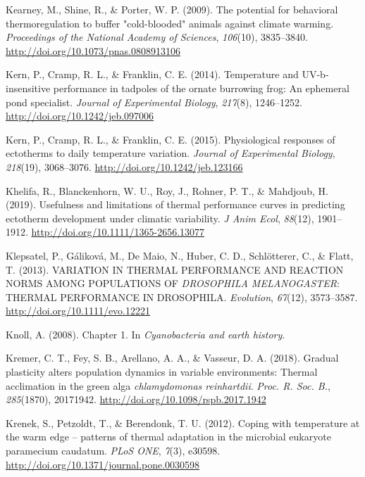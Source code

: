 \documentclass[12pt,twoside]{reedthesis}
\begin{document}
\leavevmode\hypertarget{ref-kearney_potential_2009}{}%
Kearney, M., Shine, R., \& Porter, W. P. (2009). The potential for behavioral thermoregulation to buffer "cold-blooded" animals against climate warming. \emph{Proceedings of the National Academy of Sciences}, \emph{106}(10), 3835--3840. \url{http://doi.org/10.1073/pnas.0808913106}

\leavevmode\hypertarget{ref-kern_temperature_2014}{}%
Kern, P., Cramp, R. L., \& Franklin, C. E. (2014). Temperature and UV-b-insensitive performance in tadpoles of the ornate burrowing frog: An ephemeral pond specialist. \emph{Journal of Experimental Biology}, \emph{217}(8), 1246--1252. \url{http://doi.org/10.1242/jeb.097006}

\leavevmode\hypertarget{ref-kern_physiological_2015-3}{}%
Kern, P., Cramp, R. L., \& Franklin, C. E. (2015). Physiological responses of ectotherms to daily temperature variation. \emph{Journal of Experimental Biology}, \emph{218}(19), 3068--3076. \url{http://doi.org/10.1242/jeb.123166}

\leavevmode\hypertarget{ref-khelifa_usefulness_2019}{}%
Khelifa, R., Blanckenhorn, W. U., Roy, J., Rohner, P. T., \& Mahdjoub, H. (2019). Usefulness and limitations of thermal performance curves in predicting ectotherm development under climatic variability. \emph{J Anim Ecol}, \emph{88}(12), 1901--1912. \url{http://doi.org/10.1111/1365-2656.13077}

\leavevmode\hypertarget{ref-klepsatel_variation_2013}{}%
Klepsatel, P., Gáliková, M., De Maio, N., Huber, C. D., Schlötterer, C., \& Flatt, T. (2013). VARIATION IN THERMAL PERFORMANCE AND REACTION NORMS AMONG POPULATIONS OF \emph{DROSOPHILA MELANOGASTER}: THERMAL PERFORMANCE IN DROSOPHILA. \emph{Evolution}, \emph{67}(12), 3573--3587. \url{http://doi.org/10.1111/evo.12221}

\leavevmode\hypertarget{ref-knoll_chapter_2008}{}%
Knoll, A. (2008). Chapter 1. In \emph{Cyanobacteria and earth history}.

\leavevmode\hypertarget{ref-kremer_gradual_2018}{}%
Kremer, C. T., Fey, S. B., Arellano, A. A., \& Vasseur, D. A. (2018). Gradual plasticity alters population dynamics in variable environments: Thermal acclimation in the green alga \emph{chlamydomonas reinhartdii}. \emph{Proc. R. Soc. B.}, \emph{285}(1870), 20171942. \url{http://doi.org/10.1098/rspb.2017.1942}

\leavevmode\hypertarget{ref-krenek_coping_2012}{}%
Krenek, S., Petzoldt, T., \& Berendonk, T. U. (2012). Coping with temperature at the warm edge -- patterns of thermal adaptation in the microbial eukaryote paramecium caudatum. \emph{PLoS ONE}, \emph{7}(3), e30598. \url{http://doi.org/10.1371/journal.pone.0030598}
\end{document}
